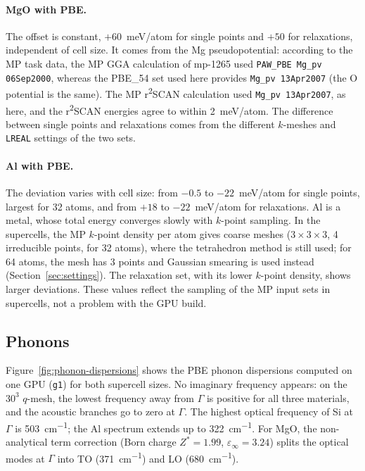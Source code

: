 \documentclass[11pt,letterpaper]{article}
\begin{document}
\paragraph{MgO with PBE.} The offset is constant, $+60$~meV/atom for single points and $+50$
for relaxations, independent of cell size. It comes from the Mg pseudopotential: according to
the MP task data, the MP GGA calculation of mp-1265 used \texttt{PAW\_PBE Mg\_pv 06Sep2000},
whereas the PBE\_54 set used here provides \texttt{Mg\_pv 13Apr2007} (the O potential is the
same). The MP r\textsuperscript{2}SCAN calculation used \texttt{Mg\_pv 13Apr2007}, as here, and the
r\textsuperscript{2}SCAN energies agree to within \SI{2}{meV/atom}. The difference between single points and
relaxations comes from the different $k$-meshes and \texttt{LREAL} settings of the two sets.

\paragraph{Al with PBE.} The deviation varies with cell size: from $-0.5$ to $-22$~meV/atom for
single points, largest for 32 atoms, and from $+18$ to $-22$~meV/atom for relaxations. Al is a metal, whose total energy converges slowly with
$k$-point sampling. In the supercells, the MP $k$-point density per atom gives coarse meshes
($3\times3\times3$, 4 irreducible points, for 32 atoms), where the tetrahedron method is still
used; for 64 atoms, the mesh has 3 points and Gaussian smearing is used instead
(Section~\ref{sec:settings}). The relaxation set, with its lower $k$-point density, shows larger
deviations. These values reflect the sampling of the MP input sets in supercells, not a
problem with the GPU build.

\subsection{Phonons}
\label{sec:res-phonons}
Figure~\ref{fig:phonon-dispersions} shows the PBE phonon dispersions computed on one GPU
(\texttt{g1}) for both supercell sizes. No imaginary frequency appears: on the $30^3$ $q$-mesh,
the lowest frequency away from $\Gamma$ is positive for all three materials, and the acoustic
branches go to zero at $\Gamma$. The highest optical frequency of Si at $\Gamma$ is
\SI{503}{cm^{-1}}; the Al spectrum extends up to \SI{322}{cm^{-1}}. For MgO, the non-analytical
term correction (Born charge $Z^*=1.99$, $\varepsilon_\infty=3.24$) splits the optical modes at
$\Gamma$ into TO (\SI{371}{cm^{-1}}) and LO (\SI{680}{cm^{-1}}).
\end{document}
